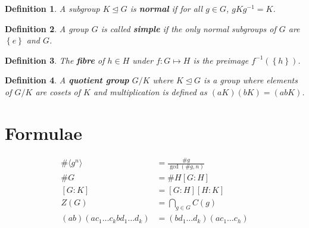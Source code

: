 \documentclass{article}
\newtheorem{definition}{Definition}
\newcommand{\set}[1]{\left\{ #1 \right\}}
\theoremstyle{definition}
\begin{document}
\begin{definition}
    A subgroup $K \trianglelefteq G$ is \textbf{normal} if for all $g \in G$, $gKg^{-1} = K$.
\end{definition}
\begin{definition}
    A group $G$ is called \textbf{simple} if the only normal subgroups of $G$ are $\set{e}$ and $G$.
\end{definition}
\begin{definition}
    The \textbf{fibre} of $h\in H$ under $f:G \mapsto H$ is the preimage $f^{-1}(\set{h})$.
\end{definition}
\begin{definition}
    A \textbf{quotient group} $G/K$ where $K \trianglelefteq G$ is a group where elements of $G/K$ are cosets of $K$ and multiplication is defined as $(aK)(bK)=(abK)$.
\end{definition}
\section{Formulae}
\begin{align*}
    \# \langle g^n \rangle &= \frac{\# g}{\gcd{(\# g, n)}} \\
        \# G &= \#H[G:H] \\
        [G:K] &= [G:H][H:K] \\
        Z(G) &= \bigcap_{g \in G} C(g) \\
        (ab)(ac_1 \ldots c_k b d_1 \ldots d_k)&=(bd_1\ldots d_k)(ac_1\ldots c_h)
\end{align*}
\end{document}
